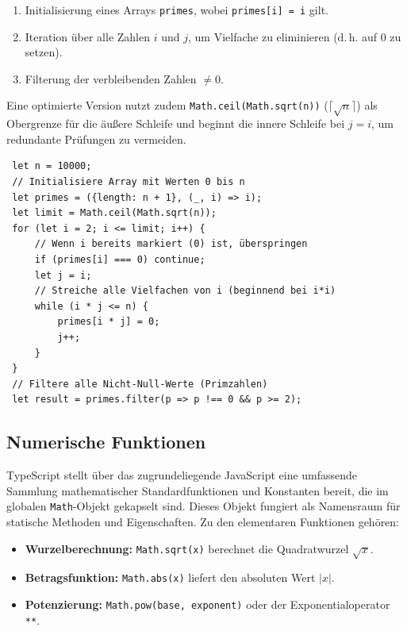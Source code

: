 \begin{enumerate} 
	\item Initialisierung eines Arrays \texttt{primes}, wobei \texttt{primes[i] = i} gilt.
	\item Iteration über alle Zahlen $i$ und $j$, um Vielfache zu eliminieren (d.\,h. auf 0 zu setzen).
	\item Filterung der verbleibenden Zahlen $\neq 0$.
\end{enumerate}
Eine optimierte Version nutzt zudem \texttt{Math.ceil(Math.sqrt(n))} (\(\lceil \sqrt{n} \rceil\)) als Obergrenze für die äußere Schleife und beginnt die innere Schleife bei $j=i$, um redundante Prüfungen zu vermeiden.
\begin{verbatim}
 let n = 10000;
 // Initialisiere Array mit Werten 0 bis n
 let primes = ({length: n + 1}, (_, i) => i);
 let limit = Math.ceil(Math.sqrt(n));
 for (let i = 2; i <= limit; i++) {
     // Wenn i bereits markiert (0) ist, überspringen
     if (primes[i] === 0) continue; 
     let j = i;
     // Streiche alle Vielfachen von i (beginnend bei i*i)
     while (i * j <= n) {
         primes[i * j] = 0;
         j++;
     }
 }
 // Filtere alle Nicht-Null-Werte (Primzahlen)
 let result = primes.filter(p => p !== 0 && p >= 2);
\end{verbatim}


\subsection{Numerische Funktionen}
\label{subsec:numerisch}
TypeScript stellt über das zugrundeliegende JavaScript eine umfassende Sammlung mathematischer Standardfunktionen und Konstanten bereit, die im globalen \texttt{Math}-Objekt gekapselt sind. Dieses Objekt fungiert als Namensraum für statische Methoden und Eigenschaften. Zu den elementaren Funktionen gehören:
\begin{itemize}
	\item \textbf{Wurzelberechnung:} \texttt{Math.sqrt(x)} berechnet die Quadratwurzel $\sqrt{x}$.
	\item \textbf{Betragsfunktion:} \texttt{Math.abs(x)} liefert den absoluten Wert $|x|$.
	\item \textbf{Potenzierung:} \texttt{Math.pow(base, exponent)} oder der Exponentialoperator \texttt{**}.
\end{itemize}

